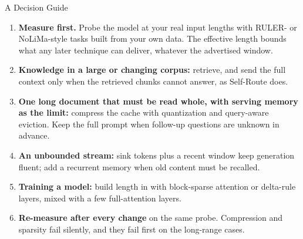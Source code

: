 \begin{frame}{A Decision Guide}
  \begin{enumerate}\footnotesize\itemsep0.45em
    \item \textbf{Measure first.} Probe the model at your real input lengths with RULER- or NoLiMa-style tasks built from your own data. The effective length bounds what any later technique can deliver, whatever the advertised window.
    \item \textbf{Knowledge in a large or changing corpus:} retrieve, and send the full context only when the retrieved chunks cannot answer, as Self-Route does.
    \item \textbf{One long document that must be read whole, with serving memory as the limit:} compress the cache with quantization and query-aware eviction. Keep the full prompt when follow-up questions are unknown in advance.
    \item \textbf{An unbounded stream:} sink tokens plus a recent window keep generation fluent; add a recurrent memory when old content must be recalled.
    \item \textbf{Training a model:} build length in with block-sparse attention or delta-rule layers, mixed with a few full-attention layers.
    \item \textbf{Re-measure after every change} on the same probe. Compression and sparsity fail silently, and they fail first on the long-range cases.
  \end{enumerate}
\end{frame}
